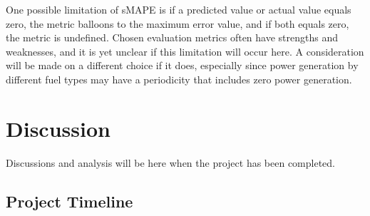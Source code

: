 \documentclass[sigconf]{acmart}
\begin{document}
One possible limitation of sMAPE is if a predicted value or actual value equals zero, the metric balloons to the maximum error value, and if both equals zero, the metric is undefined. Chosen evaluation metrics often have strengths and weaknesses, and it is yet unclear if this limitation will occur here. A consideration will be made on a different choice if it does, especially since power generation by different fuel types may have a periodicity that includes zero power generation.

\section{Discussion}
Discussions and analysis will be here when the project has been completed.

\subsection{Project Timeline}
\end{document}
